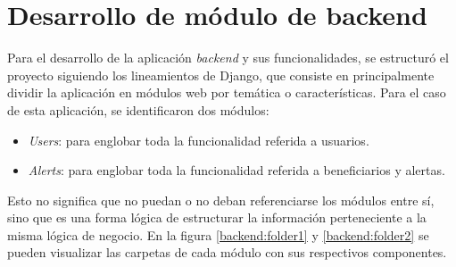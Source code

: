 \section{Desarrollo de módulo de backend}

Para el desarrollo de la aplicación \textit{backend} y sus funcionalidades, se estructuró el proyecto siguiendo los lineamientos de Django, que consiste en principalmente dividir la aplicación en módulos web por temática o características. Para el caso de esta aplicación, se identificaron dos módulos:
\begin{itemize}
	\item \textit{Users}: para englobar toda la funcionalidad referida a usuarios.
	\item \textit{Alerts}: para englobar toda la funcionalidad referida a beneficiarios y alertas.
\end{itemize}

Esto no significa que no puedan o no deban referenciarse los módulos entre sí, sino que es una forma lógica de estructurar la información perteneciente a la misma lógica de negocio. En la figura \ref{backend:folder1} y \ref{backend:folder2} se pueden visualizar las carpetas de cada módulo con sus respectivos componentes.


